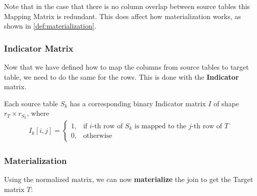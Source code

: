 Note that in the case that there is no column overlap between source tables this Mapping Matrix is redundant. This does affect how materialization works, as shown in \autoref{def:materialization}.


\subsubsection{Indicator Matrix}
Now that we have defined how to map the columns from source tables to target table, we need to do the same for the rows. This is done with the \textbf{Indicator} matrix.

\begin{definition}
    Each source table $S_k$ has a corresponding binary Indicator matrix $I$ of shape $r_T \times r_{S_k}$, where
    \begin{align*}
        I_k[i,j] = \begin{cases}
                       1, & \text{if $i$-th row of $S_k$ is mapped to the $j$-th row of $T$} \\
                       0, & \text{otherwise}
                   \end{cases}
    \end{align*}
\end{definition}



\subsubsection{Materialization}
Using the normalized matrix, we can now \textbf{materialize} the join to get the Target matrix $T$:

